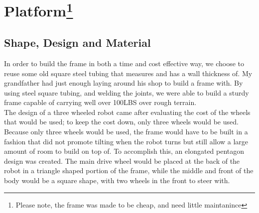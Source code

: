 \documentclass{article}
\begin{document}
\section{Platform\footnote{Please note, the frame was made to be cheap, and need little maintanince}%
}
\subsection{Shape, Design and Material}
In order to build the frame in both a time and cost effective way, we choose to reuse some old square steel tubing that measures  and has a wall thickness of. My grandfather had just enough laying around his shop to build a frame with. By using steel square tubing, and welding the joints, we were able to build a sturdy frame capable of carrying well over 100LBS over rough terrain.\\
The design of a three wheeled robot came after evaluating the cost of the wheels that would be used; to keep the cost down, only three wheels would be used. Because only three wheels would be used, the frame would have to be built in a fashion that did not promote tilting when the robot turns but still allow a large amount of room to build on top of. To accomplish this, an elongated pentagon design was created. The main drive wheel would be placed at the back of the robot in a triangle shaped portion of the frame, while the middle and front of the body would be a square shape, with two wheels in the front to steer with.\\
\end{document}
